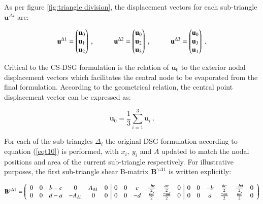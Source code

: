 As per figure \ref{fig:triangle division}, the displacement vectors for each sub-triangle $\mathbf{u}^{\Delta i}$ are:

\begin{equation} 
\mathbf{u}^{\Delta 1} = 
\begin{pmatrix}
\mathbf{u}_0 \\
\mathbf{u}_1 \\
\mathbf{u}_2
\end{pmatrix}
\ ,
\hspace{10mm}
\mathbf{u}^{\Delta 2} = 
\begin{pmatrix}
\mathbf{u}_0 \\
\mathbf{u}_2 \\
\mathbf{u}_3
\end{pmatrix}
\ ,
\hspace{10mm}
\mathbf{u}^{\Delta 3} = 
\begin{pmatrix}
\mathbf{u}_0 \\
\mathbf{u}_3 \\
\mathbf{u}_1
\end{pmatrix}
\label{eqCSDSG1}\ .
\end{equation}

Critical to the CS-DSG formulation is the relation of $\mathbf{u}_0$ to the exterior nodal displacement vectors which facilitates the central node to be evaporated from the final formulation. According to the geometrical relation, the central point displacement vector can be expressed as:

 \begin{equation} 
\mathbf{u}_0
 =
 \frac{1}{3}
 \sum_{i=1}^3
\mathbf{u}_i
 \label{eqCSDSG2}\ .
 \end{equation}
 
 For each of the sub-triangles $\Delta_i$ the original DSG formulation according to equation (\ref{eqt10}) is performed, with $x_i,\ y_i$ and $A$ updated to match the nodal positions and area of the current sub-triangle respectively. For illustrative purposes, the first sub-triangle shear B-matrix $\mathbf{B}^{\gamma\Delta 1}$ is written explicitly:
 
\begin{equation}
	\delimitershortfall=0pt
	\mathbf{B}^{\gamma\Delta 1} = 
		\left(\begin{array}{cccccc|cccccc|cccccc}
			0 & 0 & b-c & 0 & A_{\Delta 1} & 0 & 0 & 0 & c & \frac{-bc}{2} & \frac{ac}{2} & 0 & 0 & 0 & -b & \frac{bc}{2} & \frac{-bd}{2} & 0 \\
			0 & 0 & d-a & -A_{\Delta 1} & 0 & 0 & 0 & 0 & -d & \frac{bd}{2} & \frac{-ad}{2} & 0 & 0 & 0 & a & \frac{-ac}{2} & \frac{ad}{2} & 0
		\end{array}
	\right)
	 \label{eqCSDSG3}
\end{equation}

